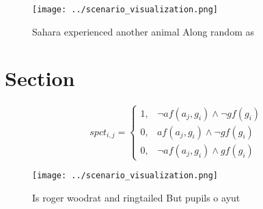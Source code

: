 \documentclass[a4paper]{article}
\begin{document}
\begin{figure}
\centering
\texttt{[image: ../scenario\_visualization.png]}
\caption{Sahara experienced another animal Along random as
}
\end{figure}
 
\section{Section}

\begin{equation}
spct_{i,j} =
\begin{cases}
1, & \text{$\neg af(a_j,g_i) \wedge \neg gf(g_i)$}\\
0, & \text{$af(a_j,g_i) \wedge \neg gf(g_i)$}\\
0, & \text{$\neg af(a_j,g_i) \wedge gf(g_i)$}
\end{cases}
\end{equation}

\begin{figure}
\centering
\texttt{[image: ../scenario\_visualization.png]}
\caption{Is roger woodrat and ringtailed But pupils o ayut
}
\end{figure}
 
\end{document}

